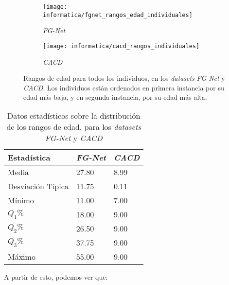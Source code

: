 \begin{figure}[H]
    \centering
    \begin{subfigure}[t]{0.55\textwidth}
        \centering
        \texttt{[image: informatica/fgnet\_rangos\_edad\_individuales]}
        \caption{\textit{FG-Net}}
    \end{subfigure}
    \begin{subfigure}[t]{0.4\textwidth}
        \centering
        \texttt{[image: informatica/cacd\_rangos\_individuales]}
        \caption{\textit{CACD}}
    \end{subfigure}

    \caption{Rangos de edad para todos los individuos, en los \textit{datasets} \textit{FG-Net} y \textit{CACD}. Los individuos están ordenados en primera instancia por su edad más baja, y en segunda instancia, por su edad más alta.}
    \label{img:conjunta_fgnet_rangos_edades_individuales}
\end{figure}

\begin{table}[H]
\centering
\begin{tabular}{|l|l|l|}
    \hline
    \textbf{Estadística} & \textbf{\textit{FG-Net}} & \textbf{\textit{CACD}} \\
    \hline

    Media             & 27.80 & 8.99 \\
    Desviación Típica & 11.75 & 0.11 \\
    Mínimo            & 11.00 & 7.00 \\
    $Q_1 \%$          & 18.00 & 9.00 \\
    $Q_2 \%$          & 26.50 & 9.00 \\
    $Q_3 \%$          & 37.75 & 9.00 \\
    Máximo            & 55.00 & 9.00 \\

    \hline

\end{tabular}
\caption{Datos estadísticos sobre la distribución de los rangos de edad, para los \textit{datasets} \textit{FG-Net} y \textit{CACD}}
    \label{table:conjunta_fgnet_estadisticas_rangos_edad}
\end{table}

A partir de esto, podemos ver que:

